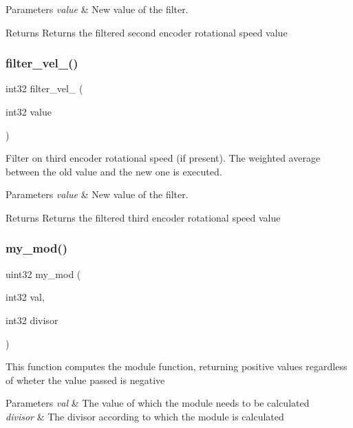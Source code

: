 \begin{DoxyParams}{Parameters}
{\em value} & New value of the filter.\\
\hline
\end{DoxyParams}
\begin{DoxyReturn}{Returns}
Returns the filtered second encoder rotational speed value 
\end{DoxyReturn}
\mbox{\label{utils_8c_a44d5627a5b0d37a70edddad83a3362ea}} 
\subsubsection{filter\+\_\+vel\+\_()}
{\footnotesize\ttfamily int32 filter\+\_\+vel\+\_ (\begin{DoxyParamCaption}\item[{int32}]{value }\end{DoxyParamCaption})}

Filter on third encoder rotational speed (if present). The weighted average between the old value and the new one is executed.


\begin{DoxyParams}{Parameters}
{\em value} & New value of the filter.\\
\hline
\end{DoxyParams}
\begin{DoxyReturn}{Returns}
Returns the filtered third encoder rotational speed value 
\end{DoxyReturn}
\mbox{\label{utils_8c_a01d3bb6c1fd469a6c530fb296e4fe0fe}} 
\subsubsection{my\+\_\+mod()}
{\footnotesize\ttfamily uint32 my\+\_\+mod (\begin{DoxyParamCaption}\item[{int32}]{val,  }\item[{int32}]{divisor }\end{DoxyParamCaption})}

This function computes the module function, returning positive values regardless of wheter the value passed is negative


\begin{DoxyParams}{Parameters}
{\em val} & The value of which the module needs to be calculated \\
\hline
{\em divisor} & The divisor according to which the module is calculated \\
\hline
\end{DoxyParams}
\mbox{\label{utils_8c_a1ea4108a2c530470624ce2678e65dcef}} 
